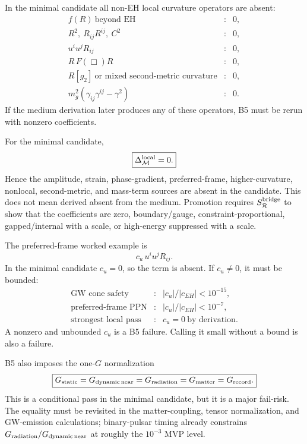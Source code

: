 \documentclass[11pt]{article}
\begin{document}
In the minimal candidate all non-EH local curvature operators are absent:
\[
\boxed{
\begin{array}{lll}
f(R)\ \text{beyond EH} &:& 0,\\
R^2,\ R_{ij}R^{ij},\ C^2 &:& 0,\\
u^iu^jR_{ij} &:& 0,\\
R\,F(\Box)R &:& 0,\\
R[g_2]\ \text{or mixed second-metric curvature} &:& 0,\\
m_g^2(\gamma_{ij}\gamma^{ij}-\gamma^2) &:& 0.
\end{array}}
\]
If the medium derivation later produces any of these operators, B5 must be
rerun with nonzero coefficients.

For the minimal candidate,
\[
\boxed{\Delta_{\mathcal M}^{\rm local}=0.}
\]
Hence the amplitude, strain, phase-gradient, preferred-frame,
higher-curvature, nonlocal, second-metric, and mass-term sources are absent in
the candidate.  This does not mean derived absent from the medium.  Promotion
requires \(S_{\mathcal R}^{\rm bridge}\) to show that the coefficients are
zero, boundary/gauge, constraint-proportional, gapped/internal with a scale, or
high-energy suppressed with a scale.

The preferred-frame worked example is
\[
\boxed{c_u\,u^iu^jR_{ij}.}
\]
In the minimal candidate \(c_u=0\), so the term is absent.  If
\(c_u\ne0\), it must be bounded:
\[
\boxed{
\begin{array}{lll}
\text{GW cone safety} &:& |c_u|/|c_{EH}|<10^{-15},\\
\text{preferred-frame PPN} &:& |c_u|/|c_{EH}|<10^{-7},\\
\text{strongest local pass} &:& c_u=0\ \text{by derivation}.
\end{array}}
\]
A nonzero and unbounded \(c_u\) is a B5 failure.  Calling it small without a
bound is also a failure.

B5 also imposes the one-\(G\) normalization
\[
\boxed{
G_{\rm static}=G_{\rm dynamic\,near}=G_{\rm radiation}=G_{\rm matter}
=G_{\rm record}.
}
\]
This is a conditional pass in the minimal candidate, but it is a major
fail-risk.  The equality must be revisited in the matter-coupling, tensor
normalization, and GW-emission calculations; binary-pulsar timing already
constrains \(G_{\rm radiation}/G_{\rm dynamic\,near}\) at roughly the
\(10^{-3}\) MVP level.
\end{document}
